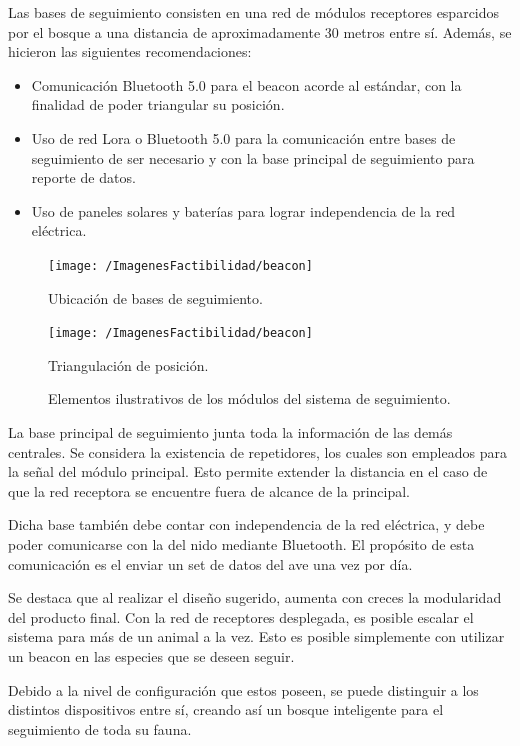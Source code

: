 Las bases de seguimiento consisten en una red de módulos receptores esparcidos por el bosque a una distancia de aproximadamente 30 metros entre sí.
Además, se hicieron las siguientes recomendaciones:
\begin{itemize}
	\item Comunicación Bluetooth 5.0 para el beacon acorde al estándar, con la finalidad de poder triangular su posición.
	\item Uso de red Lora o Bluetooth 5.0 para la comunicación entre bases de seguimiento de ser necesario y con la base principal de seguimiento para reporte de datos.
	\item Uso de paneles solares y baterías para lograr independencia de la red eléctrica.
\end{itemize}
\begin{figure}[H]
\centering
    	\centering
    	\texttt{[image: /ImagenesFactibilidad/beacon]}
  		\caption{Ubicación de bases de seguimiento.}
  		\label{fig:sfig1}
    \endminipage\hfill
    	\centering
    	\texttt{[image: /ImagenesFactibilidad/beacon]}
  		\caption{Triangulación de posición.}
  		\label{fig:sfig2}
    \endminipage
	\caption{Elementos ilustrativos de los módulos del sistema de seguimiento.}
	\label{fig:componentes beacon}
\end{figure}

La base principal de seguimiento junta toda la información de las demás centrales. Se considera la existencia de repetidores, los cuales son empleados para la señal del módulo principal. Esto permite extender la distancia en el caso de que la red receptora se encuentre fuera de alcance de la principal.

Dicha base también debe contar con independencia de la red eléctrica, y debe poder comunicarse con la del nido mediante Bluetooth. El propósito de esta comunicación es el enviar un set de datos del ave una vez por día.

Se destaca que al realizar el diseño sugerido, aumenta con creces la modularidad del producto final. Con la red de receptores desplegada, es posible escalar el sistema para más de un animal a la vez. Esto es posible simplemente con utilizar un beacon en las especies que se deseen seguir. 

Debido a la nivel de configuración que estos poseen, se puede distinguir a los distintos dispositivos entre sí, creando así un bosque inteligente para el seguimiento de toda su fauna.
